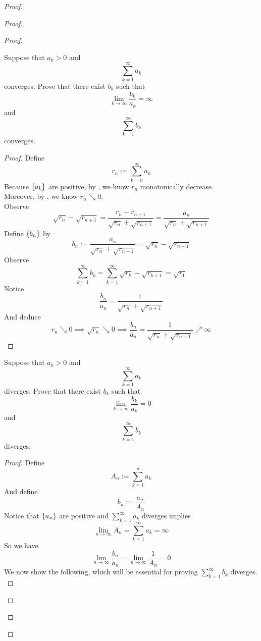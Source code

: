 \documentclass{report}
\begin{document}
\begin{proof}
\begin{proof}
\begin{proof}
\begin{question}{}{}
Suppose that \( a_k > 0 \) and 
\[
\sum_{k=1}^{\infty} a_k
\]
converges. Prove that there exist \( b_k \) such that 
\[
\lim_{k \to \infty} \frac{b_k}{a_k} = \infty
\]
and 
\[
\sum_{k=1}^{\infty} b_k
\]
converges.
\end{question}
\begin{proof}
Define
\begin{equation}
r_n:=\sum_{k=n}^\infty a_k
\end{equation}
Because $\{ a_k \}$ are positive, by , we know $r_n$ monotonically decrease.\\

Moreover, by , we know $r_n\searrow 0$.\\

Observe
\begin{equation}
\sqrt{r_n} -\sqrt{r_{n+1}}=\frac{r_n-r_{n+1}}{\sqrt{r_n} +\sqrt{r_{n+1}} }=\frac{a_n}{\sqrt{r_n} +\sqrt{r_{n+1}} }
\end{equation}
Define $\{ b_n \}$ by
\begin{equation}
b_n:=\frac{a_n}{\sqrt{r_n} +\sqrt{r_{n+1}} }=\sqrt{r_n} -\sqrt{r_{n+1}} 
\end{equation}
Observe
\begin{equation}
\sum_{k=1}^\infty b_k=\sum_{k=1}^\infty \sqrt{r_k} -\sqrt{r_{k+1}}=\sqrt{r_1}  
\end{equation}
Notice 
\begin{equation}
\frac{b_n}{a_n}=\frac{1}{\sqrt{r_n} +\sqrt{r_{n+1}} }
\end{equation}
And deduce
\begin{equation}
r_n\searrow 0\implies \sqrt{r_n} \searrow 0\implies \frac{b_n}{a_n}=\frac{1}{\sqrt{r_n} +\sqrt{r_{n+1}} }\nearrow \infty
\end{equation}
\end{proof}
\begin{question}{}{}
Suppose that \( a_k > 0 \) and 
\[
\sum_{k=1}^{\infty} a_k
\]
diverges. Prove that there exist \( b_k \) such that 
\[
\lim_{k \to \infty} \frac{b_k}{a_k} = 0
\]
and 
\[
\sum_{k=1}^{\infty} b_k
\]
diverges.
\end{question}
\begin{proof}
Define
\begin{equation}
A_n:= \sum_{k=1}^n a_k
\end{equation}
And define
\begin{equation}
b_n:=\frac{a_n}{A_n}
\end{equation}
Notice that $\{ a_n \}$ are positive and $\sum_{k=1}^\infty a_k$ diverges implies 
\begin{equation}
\lim_{n\to\infty}A_n=\sum_{k=1}^\infty a_k=\infty
\end{equation}
So we have
\begin{equation}
\lim_{n\to\infty}\frac{b_n}{a_n}=\lim_{n\to\infty}\frac{1}{A_n}=0
\end{equation}
We now show the following, which will be essential for proving $\sum_{k=1}^\infty b_k$ diverges.\\


\end{proof}
\end{proof}
\end{proof}
\end{proof}
\end{document}
